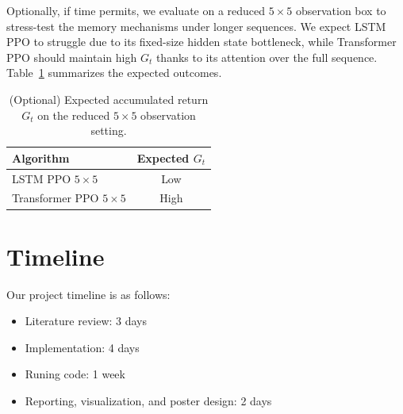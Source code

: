 \documentclass{article}
\begin{document}
Optionally, if time permits, we evaluate on a reduced $5\times5$ observation box to stress-test the memory mechanisms under longer sequences. We expect LSTM PPO to struggle due to its fixed-size hidden state bottleneck, while Transformer PPO should maintain high $G_t$ thanks to its attention over the full sequence. Table~\ref{tab:bench_ablation} summarizes the expected outcomes.

\begin{table}[H]
    \centering
    \caption{(Optional) Expected accumulated return $G_t$ on the reduced $5\times5$ observation setting.}
    \label{tab:bench_ablation}
    \begin{tabular}{lc}
        \toprule
        \textbf{Algorithm} & \textbf{Expected $G_t$} \\
        \midrule
        LSTM PPO $5\times5$        & Low  \\
        Transformer PPO $5\times5$ & High \\
        \bottomrule
    \end{tabular}
\end{table}

\section{Timeline}

Our project timeline is as follows:
\begin{itemize}
    \item Literature review: 3 days
    \item Implementation: 4 days
    \item Runing code: 1 week
    \item Reporting, visualization, and poster design: 2 days 
\end{itemize}



\end{document}
